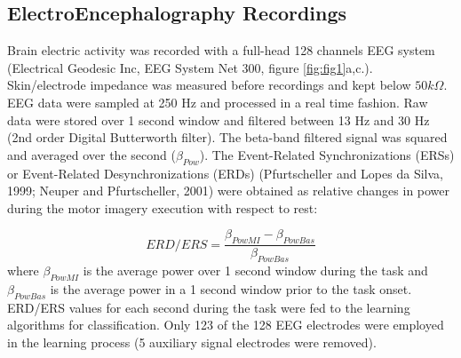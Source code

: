 \documentclass[12pt ]{iopart}
\begin{document}
\subsection{ElectroEncephalography Recordings}
Brain electric activity was recorded with a full-head 128 channels EEG system (Electrical Geodesic Inc, EEG System Net 300, figure \ref{fig:fig1}a,c.).
Skin/electrode impedance was measured before recordings and kept below $50 k\Omega$. EEG data were sampled at 250 Hz and processed in a real time fashion.  Raw data were stored over 1 second window and filtered between 13 Hz and 30 Hz (2nd order Digital Butterworth filter). The beta-band filtered signal was squared and averaged over the second ($\beta_{Pow}$).
 The Event-Related Synchronizations (ERSs) or Event-Related Desynchronizations (ERDs) (Pfurtscheller and Lopes da Silva, 1999; Neuper and Pfurtscheller, 2001) were obtained as relative changes in power during the motor imagery execution with respect to rest:

\begin{equation}
\label{eqn:erders}
ERD/ERS=\frac{\beta_{PowMI}-\beta_{PowBas}}{\beta_{PowBas}}
\end{equation} 
where $\beta_{PowMI}$ is the average power over 1 second window during the task and $\beta_{PowBas}$ is the average power in a 1 second window prior to the task onset.
ERD/ERS values for each second during the task were fed to the learning algorithms for classification. Only 123 of the 128 EEG electrodes were employed in the learning process (5 auxiliary signal electrodes were removed).
\end{document}
